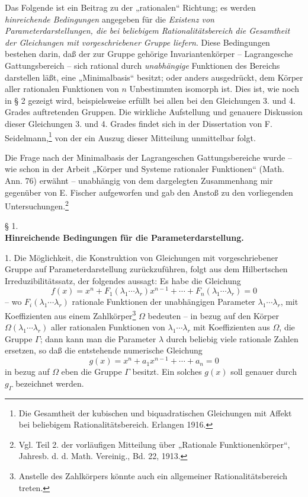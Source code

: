 \documentclass[11pt]{article}
\begin{document}
Das Folgende ist ein Beitrag zu der „rationalen“ Richtung; es werden \emph{hinreichende Bedingungen} angegeben für die \emph{Existenz von Parameterdarstellungen, die bei beliebigem Rationalitätsbereich die Gesamtheit der Gleichungen mit vorgeschriebener Gruppe liefern}. Diese Bedingungen bestehen darin, daß der zur Gruppe gehörige Invariantenkörper -- Lagrangesche Gattungsbereich -- sich rational durch \emph{unabhängige} Funktionen des Bereichs darstellen läßt, eine „Minimalbasis“ besitzt; oder anders ausgedrückt, dem Körper aller rationalen Funktionen von $n$ Unbestimmten isomorph ist. Dies ist, wie noch in § 2 gezeigt wird, beispielsweise erfüllt bei allen bei den Gleichungen 3. und 4. Grades auftretenden Gruppen. Die wirkliche Aufstellung und genauere Diskussion dieser Gleichungen 3. und 4. Grades findet sich in der Dissertation von F. Seidelmann,\footnote{Die Gesamtheit der kubischen und biquadratischen Gleichungen mit Affekt bei beliebigem Rationalitätsbereich. Erlangen 1916.} von der ein Auszug dieser Mitteilung unmittelbar folgt.

Die Frage nach der Minimalbasis der Lagrangeschen Gattungsbereiche wurde -- wie schon in der Arbeit „Körper und Systeme rationaler Funktionen“ (Math. Ann. 76) erwähnt -- unabhängig von dem dargelegten Zusammenhang mir gegenüber von E. Fischer aufgeworfen und gab den Anstoß zu den vorliegenden Untersuchungen.\footnote{Vgl. Teil 2. der vorläufigen Mitteilung über „Rationale Funktionenkörper“, Jahresb. d. d. Math. Vereinig., Bd. 22, 1913.}

\begin{center}
§ 1.\\[0.75em]
\textbf{Hinreichende Bedingungen für die Parameterdarstellung.}
\end{center}

1. Die Möglichkeit, die Konstruktion von Gleichungen mit vorgeschriebener Gruppe auf Parameterdarstellung zurückzuführen, folgt aus dem Hilbertschen Irreduzibilitätssatz, der folgendes aussagt: Es habe die Gleichung
\begin{equation}
 f(x)=x^n+F_1(\lambda_1\cdots\lambda_r)x^{n-1}+\cdots+F_n(\lambda_1\cdots\lambda_r)=0
\tag{1}
\end{equation}
-- wo $F_i(\lambda_1\cdots\lambda_r)$ rationale Funktionen der unabhängigen Parameter $\lambda_1\cdots\lambda_r$, mit Koeffizienten aus einem Zahlkörper\footnote{Anstelle des Zahlkörpers könnte auch ein allgemeiner Rationalitätsbereich treten.} $\Omega$ bedeuten -- in bezug auf den Körper $\Omega(\lambda_1\cdots\lambda_r)$ aller rationalen Funktionen von $\lambda_1\cdots\lambda_r$ mit Koeffizienten aus $\Omega$, die Gruppe $\Gamma$; dann kann man die Parameter $\lambda$ durch beliebig viele rationale Zahlen ersetzen, so daß die entstehende numerische Gleichung
\begin{equation}
 g(x)=x^n+a_1x^{n-1}+\cdots+a_n=0
\tag{2}
\end{equation}
in bezug auf $\Omega$ eben die Gruppe $\Gamma$ besitzt. Ein solches $g(x)$ soll genauer durch $g_\Gamma$ bezeichnet werden.
\end{document}
